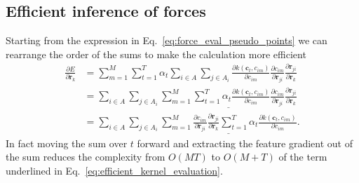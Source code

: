 \subsection{Efficient inference of forces}
Starting from the expression in Eq.~\eqref{eq:force_eval_pseudo_points} we can rearrange the order of the sums to make the calculation more efficient
\begin{subequations}
  \label{eq:efficient_kernel_evaluation}
\begin{align}
  \frac{\partial E}{\partial \mathbf{r}_k} &= \sum_{m=1}^M\sum_{t=1}^T \alpha_t \sum_{i\in A}\sum_{j\in A_i} \frac{\partial k(\mathbf{c}_{t}, c_{im})}{\partial c_{im}} \frac{\partial c_{im}}{\partial\mathbf{r}_{ji}} \frac{\partial\mathbf{r}_{ji}}{\partial\mathbf{r}_k}\\
  &= \sum_{i\in A}\sum_{j\in A_i} \underline{\sum_{m=1}^M\sum_{t=1}^T \alpha_t \frac{\partial k(\mathbf{c}_{t}, c_{im})}{\partial c_{im}} \frac{\partial c_{im}}{\partial\mathbf{r}_{ji}} \frac{\partial\mathbf{r}_{ji}}{\partial\mathbf{r}_k}}\\
  &= \sum_{i\in A}\sum_{j\in A_i}\underline{\sum_{m=1}^M\frac{\partial c_{im}}{\partial\mathbf{r}_{ji}} \frac{\partial\mathbf{r}_{ji}}{\partial\mathbf{r}_k} \sum_{t=1}^T \alpha_t \frac{\partial k(\mathbf{c}_{t}, c_{im})}{\partial c_{im}}}.
\end{align}
\end{subequations}
In fact moving the sum over $t$ forward and extracting the feature gradient out of the sum reduces the complexity from $O(MT)$ to $O(M+T)$ of the term underlined in Eq.~\eqref{eq:efficient_kernel_evaluation}.

